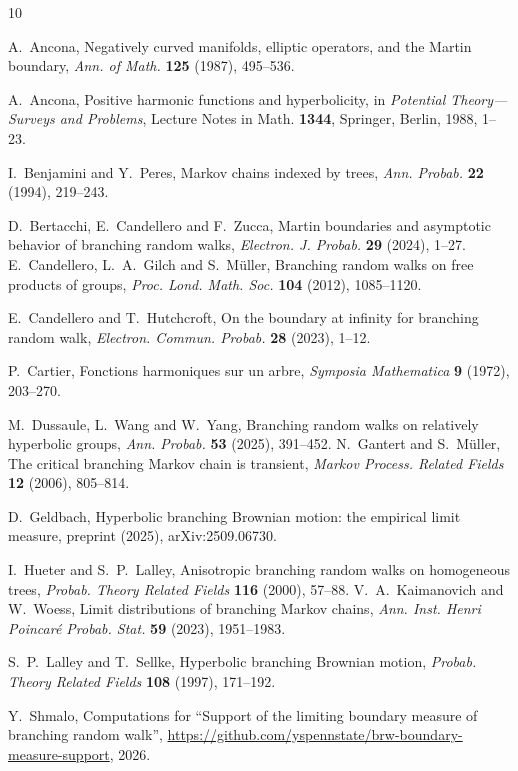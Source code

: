 \documentclass[11pt]{amsart}
\theoremstyle{definition}
\theoremstyle{remark}
\numberwithin{equation}{section}
\newcommand{\1}{\mathbf 1}
\begin{document}
\begin{thebibliography}{10}

A.~Ancona, Negatively curved manifolds, elliptic operators, and the Martin boundary, \emph{Ann. of Math.} \textbf{125} (1987), 495--536.

A.~Ancona, Positive harmonic functions and hyperbolicity, in \emph{Potential Theory---Surveys and Problems}, Lecture Notes in Math. \textbf{1344}, Springer, Berlin, 1988, 1--23.

I.~Benjamini and Y.~Peres, Markov chains indexed by trees, \emph{Ann. Probab.} \textbf{22} (1994), 219--243.

D.~Bertacchi, E.~Candellero and F.~Zucca, Martin boundaries and asymptotic behavior of branching random walks, \emph{Electron. J. Probab.} \textbf{29} (2024), 1--27.
E.~Candellero, L.~A.~Gilch and S.~M\"uller, Branching random walks on free products of groups, \emph{Proc. Lond. Math. Soc.} \textbf{104} (2012), 1085--1120.

E.~Candellero and T.~Hutchcroft, On the boundary at infinity for branching random walk, \emph{Electron. Commun. Probab.} \textbf{28} (2023), 1--12.

P.~Cartier, Fonctions harmoniques sur un arbre, \emph{Symposia Mathematica} \textbf{9} (1972), 203--270.

M.~Dussaule, L.~Wang and W.~Yang, Branching random walks on relatively hyperbolic groups, \emph{Ann. Probab.} \textbf{53} (2025), 391--452.
N.~Gantert and S.~M\"uller, The critical branching Markov chain is transient, \emph{Markov Process. Related Fields} \textbf{12} (2006), 805--814.

D.~Geldbach, Hyperbolic branching Brownian motion: the empirical limit measure, preprint (2025), arXiv:2509.06730.

I.~Hueter and S.~P.~Lalley, Anisotropic branching random walks on homogeneous trees, \emph{Probab. Theory Related Fields} \textbf{116} (2000), 57--88.
V.~A.~Kaimanovich and W.~Woess, Limit distributions of branching Markov chains, \emph{Ann. Inst. Henri Poincar\'e Probab. Stat.} \textbf{59} (2023), 1951--1983.

S.~P.~Lalley and T.~Sellke, Hyperbolic branching Brownian motion, \emph{Probab. Theory Related Fields} \textbf{108} (1997), 171--192.

Y.~Shmalo, Computations for ``Support of the limiting boundary measure of branching random walk'', \url{https://github.com/yspennstate/brw-boundary-measure-support}, 2026.


\end{thebibliography}
\end{document}
